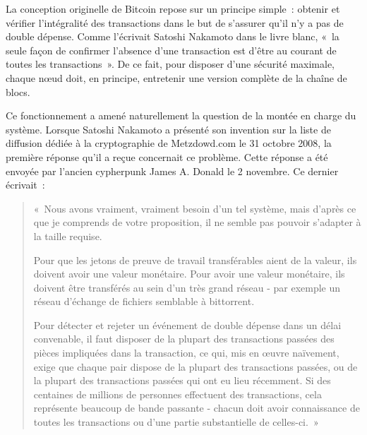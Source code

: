 La conception originelle de Bitcoin repose sur un principe simple~: obtenir et vérifier l'intégralité des transactions dans le but de s'assurer qu'il n'y a pas de double dépense. Comme l'écrivait Satoshi Nakamoto dans le livre blanc, «~la seule façon de confirmer l'absence d'une transaction est d'être au courant de toutes les transactions~». De ce fait, pour disposer d'une sécurité maximale, chaque nœud doit, en principe, entretenir une version complète de la chaîne de blocs.

Ce fonctionnement a amené naturellement la question de la montée en charge du système. Lorsque Satoshi Nakamoto a présenté son invention sur la liste de diffusion dédiée à la cryptographie de Metzdowd.com le 31 octobre 2008, la première réponse qu'il a reçue concernait ce problème. Cette réponse a été envoyée par l'ancien cypherpunk James A. Donald le 2 novembre. Ce dernier écrivait~:

\begin{quote}
«~Nous avons vraiment, vraiment besoin d'un tel système, mais d'après ce que je comprends de votre proposition, il ne semble pas pouvoir s'adapter à la taille requise.

Pour que les jetons de preuve de travail transférables aient de la valeur, ils doivent avoir une valeur monétaire. Pour avoir une valeur monétaire, ils doivent être transférés au sein d'un très grand réseau - par exemple un réseau d'échange de fichiers semblable à bittorrent.

Pour détecter et rejeter un événement de double dépense dans un délai convenable, il faut disposer de la plupart des transactions passées des pièces impliquées dans la transaction, ce qui, mis en œuvre naïvement, exige que chaque pair dispose de la plupart des transactions passées, ou de la plupart des transactions passées qui ont eu lieu récemment. Si des centaines de millions de personnes effectuent des transactions, cela représente beaucoup de bande passante - chacun doit avoir connaissance de toutes les transactions ou d'une partie substantielle de celles-ci.~»
\end{quote} %
%
%


